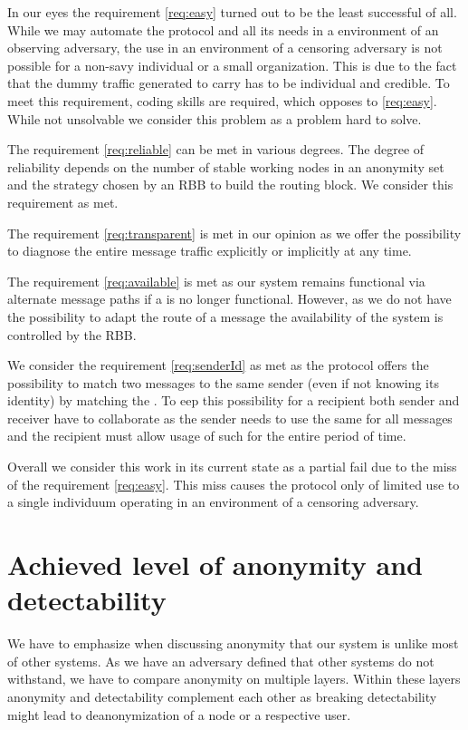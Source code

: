 In our eyes the requirement \ref{req:easy} turned out to be the least successful of all. While we may automate the \MessageVortex{} protocol and all its needs in a environment of an observing adversary, the use in an environment of a censoring adversary is not possible for a non-savy individual or a small organization. This is due to the fact that the dummy traffic generated to carry \VortexMessages{} has to be individual and credible. To meet this requirement, coding skills are required, which opposes to \ref{req:easy}. While not unsolvable we consider this problem as a problem hard to solve.

The requirement \ref{req:reliable} can be met in various degrees. The degree of reliability depends on the number of stable working nodes in an anonymity set and the strategy chosen by an RBB to build the routing block. We consider this requirement as met. 

The requirement \ref{req:transparent} is met in our opinion as we offer the possibility to diagnose the entire message traffic explicitly or implicitly at any time. 

The requirement \ref{req:available} is met as our system remains functional via alternate message paths if a \VortexNode{} is no longer functional. However, as we do not have the possibility to adapt the route of a message the availability of the system is controlled by the RBB.

We consider the requirement \ref{req:senderId} as met as the protocol offers the possibility to match two messages to the same sender (even if not knowing its identity) by matching the . To eep this possibility for a recipient both sender and receiver have to collaborate as the sender needs to use the same  for all messages and the recipient must allow usage of such  for the entire period of time.

Overall we consider this work in its current state as a partial fail due to the miss of the requirement \ref{req:easy}. This miss causes the protocol only of limited use to a single individuum operating in an environment of a censoring adversary.

\chapter{Achieved level of anonymity and detectability}
We have to emphasize when discussing anonymity that our system is unlike most of other systems. As we have an adversary defined that other systems do not withstand, we have to compare anonymity on multiple layers. Within these layers anonymity and detectability complement each other as breaking detectability might lead to deanonymization of a node or a respective user. 

